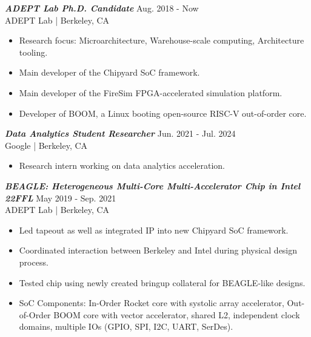 \documentclass[letter]{res}
\begin{document}
\begin{resume}
{\sl \textbf{ADEPT Lab Ph.D. Candidate}} \hfill Aug. 2018 - Now\\
ADEPT Lab | Berkeley, CA \newline

 \vspace{-4mm}

 \begin{itemize}
 \item Research focus: Microarchitecture, Warehouse-scale computing, Architecture tooling.
 \item Main developer of the Chipyard SoC framework.
 \item Main developer of the FireSim FPGA-accelerated simulation platform.
 \item Developer of BOOM, a Linux booting open-source RISC-V out-of-order core.
 \end{itemize}

\vspace{-2mm}

{\sl \textbf{Data Analytics Student Researcher}} \hfill Jun. 2021 - Jul. 2024\\
Google | Berkeley, CA \newline

 \vspace{-4mm}

 \begin{itemize}
 \item Research intern working on data analytics acceleration.
 \end{itemize}

\vspace{-2mm}

{\sl \textbf{BEAGLE: Heterogeneous Multi-Core Multi-Accelerator Chip in Intel 22FFL}} \hfill May 2019 - Sep. 2021\\
ADEPT Lab | Berkeley, CA \newline

 \vspace{-4mm}

 \begin{itemize}
 \item Led tapeout as well as integrated IP into new Chipyard SoC framework.
 \item Coordinated interaction between Berkeley and Intel during physical design process.
 \item Tested chip using newly created bringup collateral for BEAGLE-like designs.
 \item SoC Components: In-Order Rocket core with systolic array accelerator, Out-of-Order BOOM core with vector accelerator, shared L2, independent clock domains, multiple IOs (GPIO, SPI, I2C, UART, SerDes).
 \end{itemize}


\end{resume}
\end{document}
